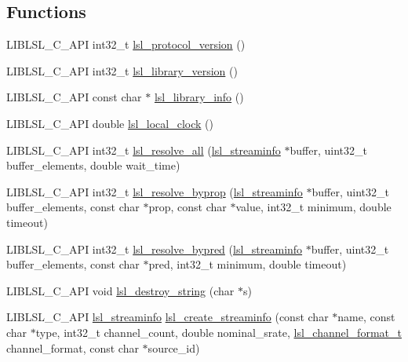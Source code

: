 \subsection*{Functions}
\begin{DoxyCompactItemize}
\item 
L\+I\+B\+L\+S\+L\+\_\+\+C\+\_\+\+A\+PI int32\+\_\+t \hyperlink{namespacelsl_a9695264d0e763474d352767702b38222}{lsl\+\_\+protocol\+\_\+version} ()
\item 
L\+I\+B\+L\+S\+L\+\_\+\+C\+\_\+\+A\+PI int32\+\_\+t \hyperlink{namespacelsl_aa706e1332352902a9b531a88af671896}{lsl\+\_\+library\+\_\+version} ()
\item 
L\+I\+B\+L\+S\+L\+\_\+\+C\+\_\+\+A\+PI const char $\ast$ \hyperlink{namespacelsl_a4e35f8426ffee9dbe7139dbe404e0442}{lsl\+\_\+library\+\_\+info} ()
\item 
L\+I\+B\+L\+S\+L\+\_\+\+C\+\_\+\+A\+PI double \hyperlink{namespacelsl_a475274f88a060924c9bd1b38879ec63a}{lsl\+\_\+local\+\_\+clock} ()
\item 
L\+I\+B\+L\+S\+L\+\_\+\+C\+\_\+\+A\+PI int32\+\_\+t \hyperlink{namespacelsl_a075ab08464c90d97b8f081d89ea889f2}{lsl\+\_\+resolve\+\_\+all} (\hyperlink{namespacelsl_aa0a9ce9956061679949daa2e35aae2e8}{lsl\+\_\+streaminfo} $\ast$buffer, uint32\+\_\+t buffer\+\_\+elements, double wait\+\_\+time)
\item 
L\+I\+B\+L\+S\+L\+\_\+\+C\+\_\+\+A\+PI int32\+\_\+t \hyperlink{namespacelsl_a66563e2290de3b056a5480ced8596ec7}{lsl\+\_\+resolve\+\_\+byprop} (\hyperlink{namespacelsl_aa0a9ce9956061679949daa2e35aae2e8}{lsl\+\_\+streaminfo} $\ast$buffer, uint32\+\_\+t buffer\+\_\+elements, const char $\ast$prop, const char $\ast$value, int32\+\_\+t minimum, double timeout)
\item 
L\+I\+B\+L\+S\+L\+\_\+\+C\+\_\+\+A\+PI int32\+\_\+t \hyperlink{namespacelsl_a11a5ef91d32961e0ad1d44dbef948399}{lsl\+\_\+resolve\+\_\+bypred} (\hyperlink{namespacelsl_aa0a9ce9956061679949daa2e35aae2e8}{lsl\+\_\+streaminfo} $\ast$buffer, uint32\+\_\+t buffer\+\_\+elements, const char $\ast$pred, int32\+\_\+t minimum, double timeout)
\item 
L\+I\+B\+L\+S\+L\+\_\+\+C\+\_\+\+A\+PI void \hyperlink{namespacelsl_ac517533eaabb224fd2f893e1f4274d82}{lsl\+\_\+destroy\+\_\+string} (char $\ast$s)
\item 
L\+I\+B\+L\+S\+L\+\_\+\+C\+\_\+\+A\+PI \hyperlink{namespacelsl_aa0a9ce9956061679949daa2e35aae2e8}{lsl\+\_\+streaminfo} \hyperlink{namespacelsl_abf20c6316cd58a713a674ef2213914d2}{lsl\+\_\+create\+\_\+streaminfo} (const char $\ast$name, const char $\ast$type, int32\+\_\+t channel\+\_\+count, double nominal\+\_\+srate, \hyperlink{namespacelsl_af188e978739868560b53dbf0ddd58e66}{lsl\+\_\+channel\+\_\+format\+\_\+t} channel\+\_\+format, const char $\ast$source\+\_\+id)

\end{DoxyCompactItemize}
